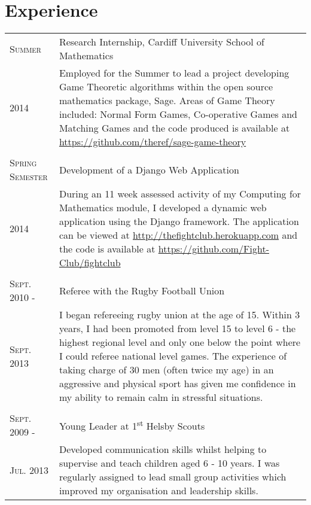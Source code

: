 \documentclass[a4paper]{article}
\begin{document}
\section{Experience}
\begin{tabularx}{\textwidth}{lX}

\textsc{Summer} & Research Internship, Cardiff University School of Mathematics \\
\textsc{2014}& \footnotesize{Employed for the Summer to lead a project developing Game Theoretic algorithms within the open source mathematics package, Sage. Areas of Game Theory included: Normal Form Games, Co-operative Games and Matching Games and the code produced is available at \url{https://github.com/theref/sage-game-theory}} \\
\\
\textsc{Spring Semester} & Development of a Django Web Application\\
\textsc{2014}& \footnotesize{During an 11 week assessed activity of my Computing for Mathematics module, I developed a dynamic web application using the Django framework. The application can be viewed at \url{http://thefightclub.herokuapp.com} and the code is available at \url{https://github.com/Fight-Club/fightclub}} \\
\\
\textsc{Sept. 2010 -} & Referee with the Rugby Football Union \\
\textsc{Sept. 2013} & \footnotesize{I began refereeing rugby union at the age of 15. Within 3 years, I had been promoted from level 15 to level 6 - the highest regional level and only one below the point where I could referee national level games.
The experience of taking charge of 30 men (often twice my age) in an aggressive and physical sport has given me confidence in my ability to remain calm in stressful situations.}\\
\\
\textsc{Sept. 2009 -} & Young Leader at 1\textsuperscript{st} Helsby Scouts\\
\textsc{Jul. 2013}& \footnotesize{Developed communication skills whilst helping to supervise and teach children aged 6 - 10 years.
I was regularly assigned to lead small group activities which improved my organisation and leadership skills.}\\

\end{tabularx}
\end{document}
